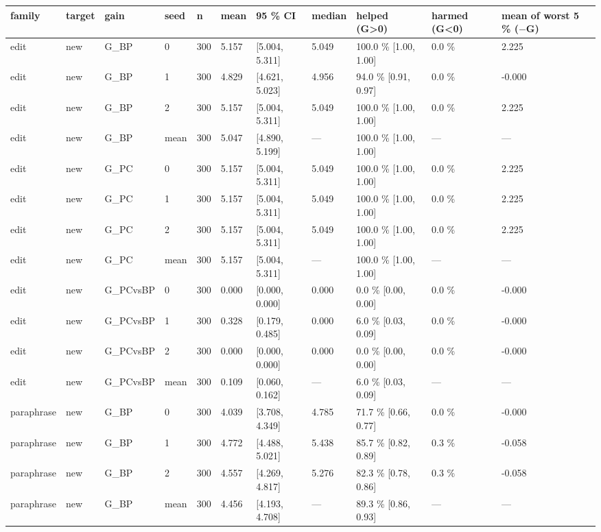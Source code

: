 \documentclass[10pt,a4paper]{article}
\begin{document}
\begin{center}\tiny
\begin{tabularx}{\textwidth}{@{}p{}XXXXXXXXXX@{}}
\toprule
family & target & gain & seed & n & mean & 95 \% CI & median & helped (G>0) & harmed (G<0) & mean of worst 5 \% ($-$G) \\ \midrule
edit & new & G\_BP & 0 & 300 & 5.157 & [5.004, 5.311] & 5.049 & 100.0 \% [1.00, 1.00] & 0.0 \% & 2.225 \\
edit & new & G\_BP & 1 & 300 & 4.829 & [4.621, 5.023] & 4.956 & 94.0 \% [0.91, 0.97] & 0.0 \% & -0.000 \\
edit & new & G\_BP & 2 & 300 & 5.157 & [5.004, 5.311] & 5.049 & 100.0 \% [1.00, 1.00] & 0.0 \% & 2.225 \\
edit & new & G\_BP & mean & 300 & 5.047 & [4.890, 5.199] & — & 100.0 \% [1.00, 1.00] & — & — \\
edit & new & G\_PC & 0 & 300 & 5.157 & [5.004, 5.311] & 5.049 & 100.0 \% [1.00, 1.00] & 0.0 \% & 2.225 \\
edit & new & G\_PC & 1 & 300 & 5.157 & [5.004, 5.311] & 5.049 & 100.0 \% [1.00, 1.00] & 0.0 \% & 2.225 \\
edit & new & G\_PC & 2 & 300 & 5.157 & [5.004, 5.311] & 5.049 & 100.0 \% [1.00, 1.00] & 0.0 \% & 2.225 \\
edit & new & G\_PC & mean & 300 & 5.157 & [5.004, 5.311] & — & 100.0 \% [1.00, 1.00] & — & — \\
edit & new & G\_PCvsBP & 0 & 300 & 0.000 & [0.000, 0.000] & 0.000 & 0.0 \% [0.00, 0.00] & 0.0 \% & -0.000 \\
edit & new & G\_PCvsBP & 1 & 300 & 0.328 & [0.179, 0.485] & 0.000 & 6.0 \% [0.03, 0.09] & 0.0 \% & -0.000 \\
edit & new & G\_PCvsBP & 2 & 300 & 0.000 & [0.000, 0.000] & 0.000 & 0.0 \% [0.00, 0.00] & 0.0 \% & -0.000 \\
edit & new & G\_PCvsBP & mean & 300 & 0.109 & [0.060, 0.162] & — & 6.0 \% [0.03, 0.09] & — & — \\
paraphrase & new & G\_BP & 0 & 300 & 4.039 & [3.708, 4.349] & 4.785 & 71.7 \% [0.66, 0.77] & 0.0 \% & -0.000 \\
paraphrase & new & G\_BP & 1 & 300 & 4.772 & [4.488, 5.021] & 5.438 & 85.7 \% [0.82, 0.89] & 0.3 \% & -0.058 \\
paraphrase & new & G\_BP & 2 & 300 & 4.557 & [4.269, 4.817] & 5.276 & 82.3 \% [0.78, 0.86] & 0.3 \% & -0.058 \\
paraphrase & new & G\_BP & mean & 300 & 4.456 & [4.193, 4.708] & — & 89.3 \% [0.86, 0.93] & — & — \\

\end{tabularx}
\end{center}
\end{document}
